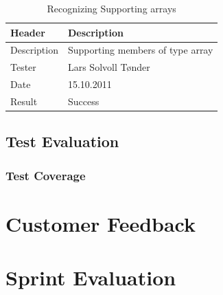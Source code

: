 \begin{table}[!htb] \footnotesize \center
\caption{Recognizing Supporting arrays \label{tab:sp2TID09}}
\begin{tabular}{l l}
	\toprule
	Header & Description \\
	\midrule
	Description &  Supporting members of type array   \\
	Tester & Lars Solvoll Tønder \\
	Date & 15.10.2011 \\
	Result & Success\\
	\bottomrule
\end{tabular}
\end{table}


\subsection{Test Evaluation}

\subsubsection{Test Coverage}


\section{Customer Feedback}


\section{Sprint Evaluation}


